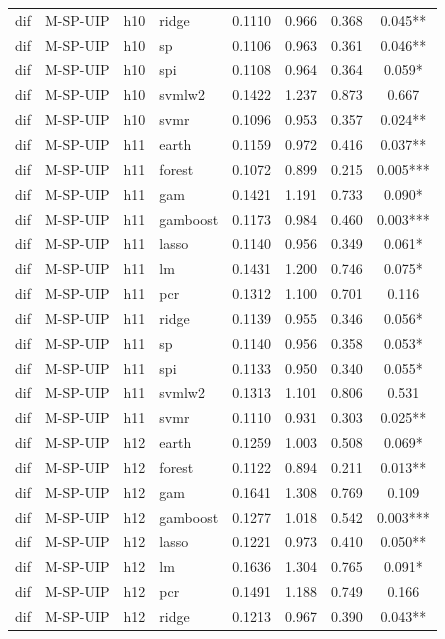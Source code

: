 \begin{ThreePartTable}
\begin{longtable}[t]{llclcccc}
dif & M-SP-UIP & h10 & ridge & 0.1110 & 0.966 & 0.368 & 0.045**\\
dif & M-SP-UIP & h10 & sp & 0.1106 & 0.963 & 0.361 & 0.046**\\
dif & M-SP-UIP & h10 & spi & 0.1108 & 0.964 & 0.364 & 0.059*\\
dif & M-SP-UIP & h10 & svmlw2 & 0.1422 & 1.237 & 0.873 & 0.667\\
dif & M-SP-UIP & h10 & svmr & 0.1096 & 0.953 & 0.357 & 0.024**\\
\addlinespace
dif & M-SP-UIP & h11 & earth & 0.1159 & 0.972 & 0.416 & 0.037**\\
dif & M-SP-UIP & h11 & forest & 0.1072 & 0.899 & 0.215 & 0.005***\\
dif & M-SP-UIP & h11 & gam & 0.1421 & 1.191 & 0.733 & 0.090*\\
dif & M-SP-UIP & h11 & gamboost & 0.1173 & 0.984 & 0.460 & 0.003***\\
dif & M-SP-UIP & h11 & lasso & 0.1140 & 0.956 & 0.349 & 0.061*\\
dif & M-SP-UIP & h11 & lm & 0.1431 & 1.200 & 0.746 & 0.075*\\
dif & M-SP-UIP & h11 & pcr & 0.1312 & 1.100 & 0.701 & 0.116\\
dif & M-SP-UIP & h11 & ridge & 0.1139 & 0.955 & 0.346 & 0.056*\\
dif & M-SP-UIP & h11 & sp & 0.1140 & 0.956 & 0.358 & 0.053*\\
dif & M-SP-UIP & h11 & spi & 0.1133 & 0.950 & 0.340 & 0.055*\\
dif & M-SP-UIP & h11 & svmlw2 & 0.1313 & 1.101 & 0.806 & 0.531\\
dif & M-SP-UIP & h11 & svmr & 0.1110 & 0.931 & 0.303 & 0.025**\\
\addlinespace
dif & M-SP-UIP & h12 & earth & 0.1259 & 1.003 & 0.508 & 0.069*\\
dif & M-SP-UIP & h12 & forest & 0.1122 & 0.894 & 0.211 & 0.013**\\
dif & M-SP-UIP & h12 & gam & 0.1641 & 1.308 & 0.769 & 0.109\\
dif & M-SP-UIP & h12 & gamboost & 0.1277 & 1.018 & 0.542 & 0.003***\\
dif & M-SP-UIP & h12 & lasso & 0.1221 & 0.973 & 0.410 & 0.050**\\
dif & M-SP-UIP & h12 & lm & 0.1636 & 1.304 & 0.765 & 0.091*\\
dif & M-SP-UIP & h12 & pcr & 0.1491 & 1.188 & 0.749 & 0.166\\
dif & M-SP-UIP & h12 & ridge & 0.1213 & 0.967 & 0.390 & 0.043**\\

\end{longtable}
\end{ThreePartTable}
